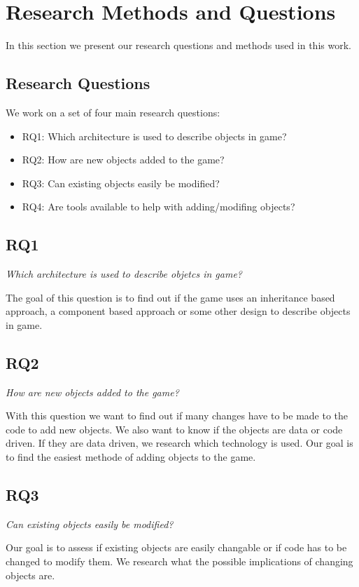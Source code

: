 \section{Research Methods and Questions}
In this section we present our research questions and methods used in this work. 

\subsection{Research Questions}
We work on a set of four main research questions:
\begin{itemize}
	\item RQ1: Which architecture is used to describe objects in game?
	\item RQ2: How are new objects added to the game?
	\item RQ3: Can existing objects easily be modified?
	\item RQ4: Are tools available to help with adding/modifing objects?
\end{itemize}

\subsection{RQ1}
\textit{Which architecture is used to describe objetcs in game?}

The goal of this question is to find out if the game uses an inheritance based approach, a component based approach or
some other design to describe objects in game. 

\subsection{RQ2}
\textit{How are new objects added to the game?}

With this question we want to find out if many changes have to be made to the code to add new objects. We also want
to know if the objects are data or code driven. If they are data driven, we research which technology is used. Our goal
is to find the easiest methode of adding objects to the game.

\subsection{RQ3}
\textit{Can existing objects easily be modified?}

Our goal is to assess if existing objects are easily changable or if code has to be changed to modify them. We
research what the possible implications of changing objects are.

